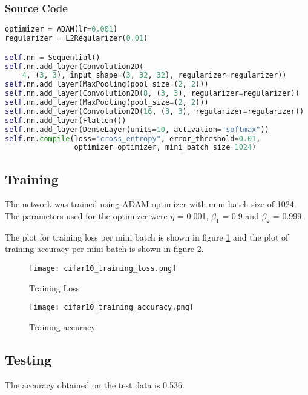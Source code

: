 \documentclass{article}
\begin{document}
\subsubsection{Source Code}
\begin{lstlisting}[language=python]
optimizer = ADAM(lr=0.001)
regularizer = L2Regularizer(0.01)

self.nn = Sequential()
self.nn.add_layer(Convolution2D(
    4, (3, 3), input_shape=(3, 32, 32), regularizer=regularizer))
self.nn.add_layer(MaxPooling(pool_size=(2, 2)))
self.nn.add_layer(Convolution2D(8, (3, 3), regularizer=regularizer))
self.nn.add_layer(MaxPooling(pool_size=(2, 2)))
self.nn.add_layer(Convolution2D(16, (3, 3), regularizer=regularizer))
self.nn.add_layer(Flatten())
self.nn.add_layer(DenseLayer(units=10, activation="softmax"))
self.nn.compile(loss="cross_entropy", error_threshold=0.01,
                optimizer=optimizer, mini_batch_size=1024)
\end{lstlisting}

\subsection{Training}
The network was trained using ADAM optimizer with mini batch size of 1024. The parameters
used for the optimizer were $\eta$ = 0.001, $\beta_1$ = 0.9 and 
$\beta_2$ = 0.999.

The plot for training loss per mini batch is shown in figure {\ref{fig:training_loss}}
and the plot of training accuracy per mini batch is shown in figure {\ref{fig:training_accuracy}}.

\begin{figure}[!ht]
  \texttt{[image: cifar10\_training\_loss.png]}
  \caption{Training Loss}
  \label{fig:training_loss}
\end{figure}

\begin{figure}[!ht]
  \texttt{[image: cifar10\_training\_accuracy.png]}
  \caption{Training accuracy}
  \label{fig:training_accuracy}
\end{figure}

\subsection{Testing}
The accuracy obtained on the test data is 0.536.
\end{document}
